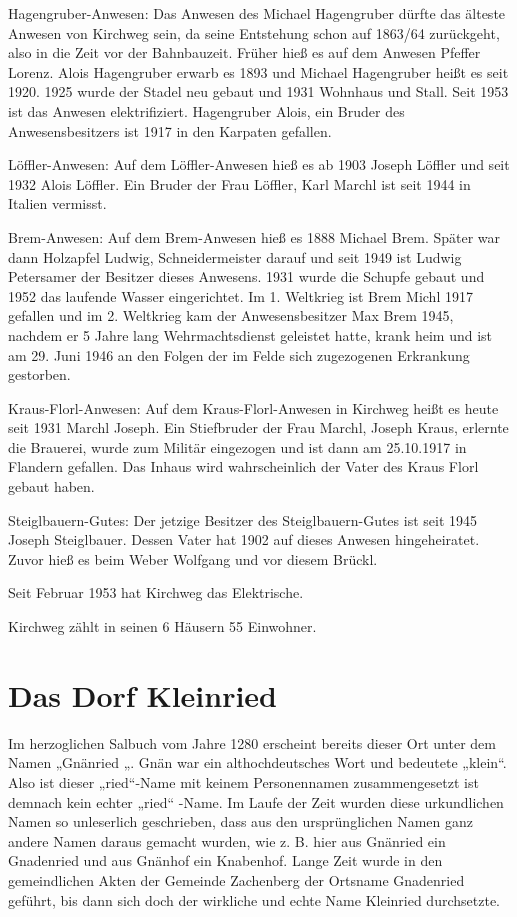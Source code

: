 \documentclass[12pt,a4pager]{book}
\begin{document}
Hagengruber-Anwesen: Das Anwesen des Michael Hagengruber dürfte das älteste
Anwesen von Kirchweg sein, da seine Entstehung schon auf 1863/64 zurückgeht,
also in die Zeit vor der Bahnbauzeit. Früher hieß es auf dem Anwesen Pfeffer
Lorenz. Alois Hagengruber erwarb es 1893 und Michael Hagengruber heißt es seit
1920. 1925 wurde der Stadel neu gebaut und 1931 Wohnhaus und Stall. Seit 1953
ist das Anwesen elektrifiziert. Hagengruber Alois, ein Bruder des
Anwesensbesitzers ist 1917 in den Karpaten gefallen.

Löffler-Anwesen: Auf dem Löffler-Anwesen hieß es ab 1903 Joseph Löffler und seit
1932 Alois Löffler. Ein Bruder der Frau Löffler, Karl Marchl ist seit 1944 in
Italien vermisst.

Brem-Anwesen: Auf dem Brem-Anwesen hieß es 1888 Michael Brem. Später war dann
Holzapfel Ludwig, Schneidermeister darauf und seit 1949 ist Ludwig Petersamer
der Besitzer dieses Anwesens. 1931 wurde die Schupfe gebaut und 1952 das
laufende Wasser eingerichtet. Im 1. Weltkrieg ist Brem Michl 1917 gefallen und
im 2. Weltkrieg kam der Anwesensbesitzer Max Brem 1945, nachdem er 5 Jahre lang
Wehrmachtsdienst geleistet hatte, krank heim und ist am 29. Juni 1946 an den
Folgen der im Felde sich zugezogenen Erkrankung gestorben.

Kraus-Florl-Anwesen: Auf dem Kraus-Florl-Anwesen in Kirchweg heißt es heute seit
1931 Marchl Joseph. Ein Stiefbruder der Frau Marchl, Joseph Kraus, erlernte die
Brauerei, wurde zum Militär eingezogen und ist dann am 25.10.1917 in Flandern
gefallen. Das Inhaus wird wahrscheinlich der Vater des Kraus Florl gebaut haben.

Steiglbauern-Gutes: Der jetzige Besitzer des Steiglbauern-Gutes ist seit 1945
Joseph Steiglbauer. Dessen Vater hat 1902 auf dieses Anwesen hingeheiratet.
Zuvor hieß es beim Weber Wolfgang und vor diesem Brückl.

Seit Februar 1953 hat Kirchweg das Elektrische.

Kirchweg zählt in seinen 6 Häusern 55 Einwohner.

\section{Das Dorf Kleinried}

Im herzoglichen Salbuch vom Jahre 1280 erscheint bereits dieser Ort unter dem
Namen „Gnänried „. Gnän war ein althochdeutsches Wort und bedeutete „klein“.
Also ist dieser „ried“-Name mit keinem Personennamen zusammengesetzt ist demnach
kein echter „ried“ -Name. Im Laufe der Zeit wurden diese urkundlichen Namen so
unleserlich geschrieben, dass aus den ursprünglichen Namen ganz andere Namen
daraus gemacht wurden, wie z. B. hier aus Gnänried ein Gnadenried und aus
Gnänhof ein Knabenhof. Lange Zeit wurde in den gemeindlichen Akten der Gemeinde
Zachenberg der Ortsname Gnadenried geführt, bis dann sich doch der wirkliche und
echte Name Kleinried durchsetzte.
\end{document}
